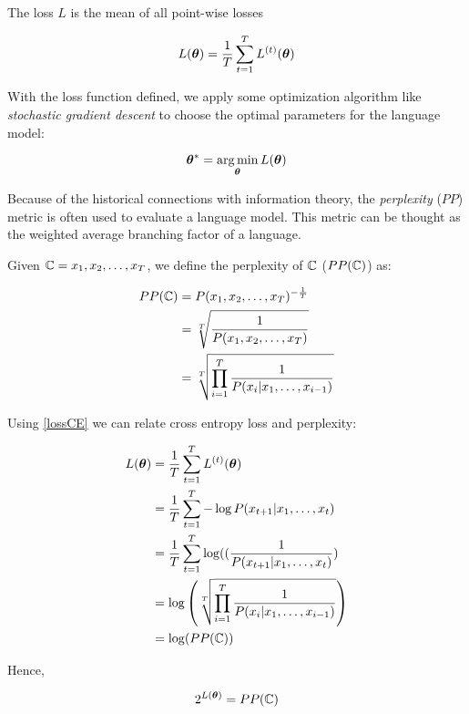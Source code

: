 The loss $L$ is the mean of all point-wise losses

\begin{equation}
L(\bm{\theta})=\frac{1}{T}\sum_{t=1}^{T}L^{(t)}(\bm{\theta})
\end{equation}



With the loss function defined, we apply some optimization algorithm like \textit{stochastic gradient descent} to choose the optimal parameters for the language model:

\begin{equation}
\bm{\theta}^{*} = \operatorname*{arg\,min}_{\bm{\theta}} L(\bm{\theta})
\end{equation}


Because of the historical connections with information theory, the \textit{perplexity} ($PP$) metric is often used to evaluate a language model. This metric can be thought as the weighted average branching factor of a language.

Given $\mathbb{C} = x_1, x_2, \dots, x_T$, we define the perplexity of $\mathbb{C}$ ($PP(\mathbb{C})$) as:

\begin{align}
PP(\mathbb{C}) &= P(x_1, x_2, \dots, x_T)^{-\frac{1}{T}}\\
      &= \sqrt[T]{\frac{1}{P(x_1, x_2, \dots, x_T)}}\\
      &= \sqrt[T]{\prod_{i=1}^{T}\frac{1}{P(x_i \vert x_1,\dots, x_{i-1})}}
\end{align}

Using \ref{lossCE} we can relate cross entropy loss and perplexity:

\begin{align}
        L(\bm{\theta}) &=\frac{1}{T} \sum_{t=1}^{T} L^{(t)}(\bm{\theta})\\
          &=\frac{1}{T} \sum_{t=1}^{T} - \log P(x_{t+1}|x_{1}, \dots, x_{t})\\
          &=\frac{1}{T} \sum_{t=1}^{T} \log ((\frac{1}{P(x_{t+1}|x_{1}, \dots, x_{t})})\\
          &= \log\left( \sqrt[T]{\prod_{i=1}^{T}\frac{1}{P(x_i \vert x_1,\dots, x_{i-1})}} \right)\\
          &= \log(PP(\mathbb{C}))
\end{align}

Hence,

\begin{equation}
2^{L(\bm{\theta})} = PP(\mathbb{C})
\end{equation}

